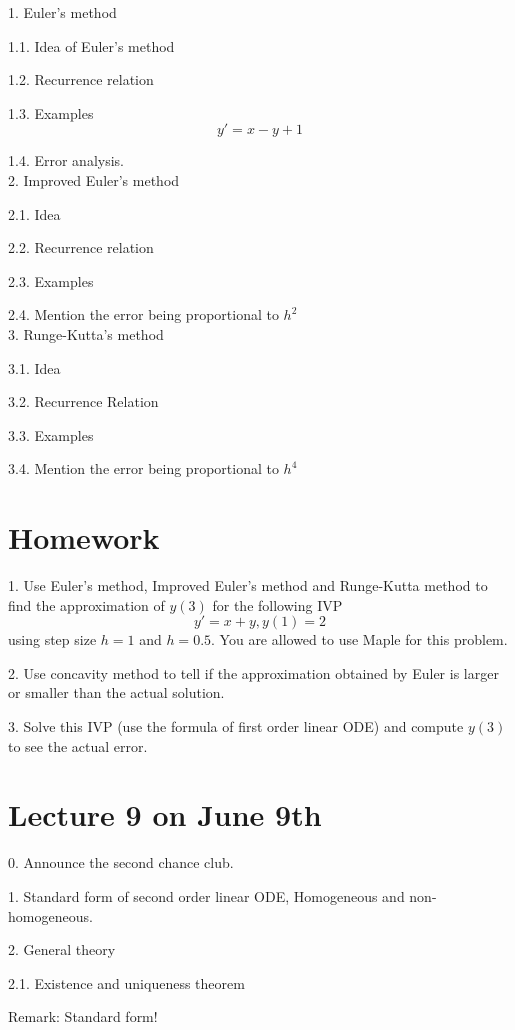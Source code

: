 \documentclass[11pt]{article}
\begin{document}
1. Euler's method

1.1. Idea of Euler's method

1.2. Recurrence relation

1.3. Examples
$$y' = x - y + 1$$

1.4. Error analysis. \\

2. Improved Euler's method

2.1. Idea

2.2. Recurrence relation

2.3. Examples

2.4. Mention the error being proportional to $h^2$\\

3. Runge-Kutta's method

3.1. Idea

3.2. Recurrence Relation

3.3. Examples

3.4. Mention the error being proportional to $h^4$


\newpage

\section*{Homework}

1. Use Euler's method, Improved Euler's method and Runge-Kutta method to find the approximation of $y(3)$ for the following IVP
$$y' = x + y, y(1) = 2$$
using step size $h=1$ and $h=0.5$. You are allowed to use Maple for this problem. 

2. Use concavity method to tell if the approximation obtained by Euler is larger or smaller than the actual solution. 

3. Solve this IVP (use the formula of first order linear ODE) and compute $y(3)$ to see the actual error. 

\newpage

\section{Lecture 9 on June 9th}

0. Announce the second chance club. 

1. Standard form of second order linear ODE, Homogeneous and non-homogeneous. 

2. General theory 

2.1. Existence and uniqueness theorem

Remark: Standard form! 
\end{document}
